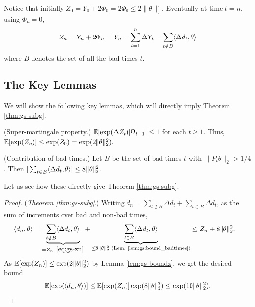 Notice that initially $Z_0 = Y_0 + 2 \Phi_0 = 2 \Phi_0 \leq  2 \|\theta\|_2^2$. 
Eventually at time $t=n$, using $\Phi_n=0$,
\begin{equation}
        Z_n  = Y_n + 2 \Phi_n = Y_n  
       = \sum_{t=1}^n \Delta Y_t =   \sum_{t \notin B}   \langle \Delta d_t,\theta\rangle  \label{eq:gs-zn}
\end{equation}
where $B$ denotes the set of all the bad times $t$.

\allowdisplaybreaks
\subsection{The Key Lemmas} We will show the following key lemmas, which will directly imply Theorem \ref{thm:gs-subg}.
\begin{lemma} (Super-martingale property.) 
\label{lem:gs-boundz}
$ \mathbb{E}[\exp(\Delta Z_t)| \Omega_{t-1}] \leq 1$ for  each $t \geq 1$. Thus,  $\mathbb{E}[\exp(Z_n)] \leq  \exp(Z_{0}) = \exp(2 \|\theta\|_2^2).$
 \end{lemma}

\begin{lemma} (Contribution of bad times.)
\label{lem:gs:bound_badtimes} Let $B$ be the set of bad times $t$ with $\|P_t \theta\|_2> 1/4$. Then $|\sum_{t \in B} \langle \Delta d_t,\theta\rangle| \leq 8\|\theta\|_2^2$. 
\end{lemma}
Let us see how these directly give Theorem \ref{thm:gs-subg}.
\begin{proof}(\emph{Theorem \ref{thm:gs-subg}}.)
Writing $d_n = \sum_{t \notin B} \Delta d_t + \sum_{t\in B} \Delta d_t$, as the sum of increments over bad and non-bad times,
\begin{align*} 
\langle d_n,\theta\rangle &= \underbrace{\sum_{t \notin B} \langle  \Delta d_t,\theta\rangle}_{=Z_n\,\,\, \eqref{eq:gs-zn}} + \underbrace{\sum_{t \in B} \langle  \Delta d_t,\theta\rangle}_{\leq 8\|\theta\|_2^2 \text{ (Lem. \ref{lem:gs:bound_badtimes})}} \leq Z_n + 8\|\theta\|_2^2.
\end{align*}
As $\mathbb{E}[\exp(Z_n)] \leq  \exp(2 \|\theta\|_2^2) $ by Lemma \ref{lem:gs-boundz}, we get the desired bound 
\[\mathbb{E}[\exp( \langle d_n,\theta\rangle)] \leq \mathbb{E}[ \exp(Z_n)]  \exp(8 \|\theta\|_2^2) \leq   \exp(10 \|\theta\|_2^2). \qedhere\]
\end{proof} 

